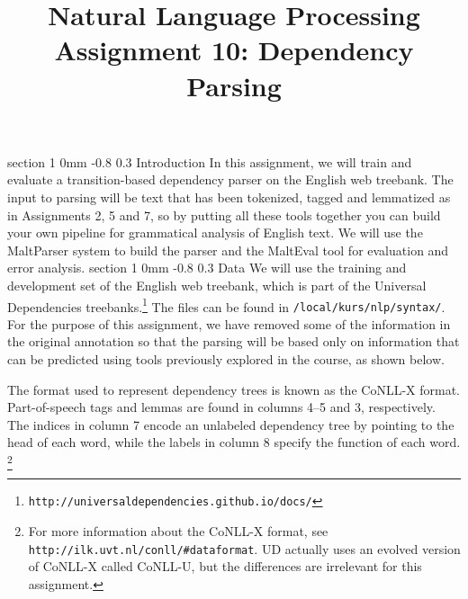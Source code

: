 \documentclass[10.9pt]{article}
\title{{\LARGE Natural Language Processing}\\[1.5mm]{\large Assignment 10: Dependency Parsing}}
\author{}
\date{} %
\makeatletter
\newcommand{\newsec}[2]{\section{#1}\label{sec:#2}\noindent}
\renewcommand{\section}{\@startsection
{section}%
{1}%
{0mm}%
{-0.8\baselineskip}%
{0.3\baselineskip}%
{\bfseries\large}}%
\makeatother
\begin{document}
 

\maketitle
\vspace{-2mm}
\newsec{Introduction}{intro}%
In this assignment, we will train and evaluate a transition-based dependency parser on the English web treebank. The input to parsing will be text that has been tokenized, tagged and lemmatized as in Assignments 2, 5 and 7, so by putting all these tools together you can build your own pipeline for grammatical analysis of English text. We will use the MaltParser system to build the parser and the MaltEval tool for evaluation and error analysis. 
\newsec{Data}{data}%
We will use the training and development set of the English web treebank, which is part of the Universal Dependencies treebanks.\footnote{{\tt http://universaldependencies.github.io/docs/}} The files can
be found in {\tt /local/kurs/nlp/syntax/}.
For the purpose of this assignment, we have removed some of the information in the original annotation 
so that the parsing will be based only on information that can be predicted using tools previously explored 
in the course, as shown below.
\begin{center}
\fbox{

}
\end{center}
The format used to represent dependency trees is known as the CoNLL-X format. Part-of-speech tags and lemmas are found in columns 4--5 and 3, respectively. The indices in column 7 encode an unlabeled dependency
tree by pointing to the head of each word, while the labels in column 8 specify the function of each word.%
\footnote{For more information about the CoNLL-X format, see 
{\tt http://ilk.uvt.nl/conll/\#dataformat}. UD actually 
uses an evolved version of CoNLL-X called CoNLL-U, but the differences are irrelevant for this assignment.}
\end{document}
